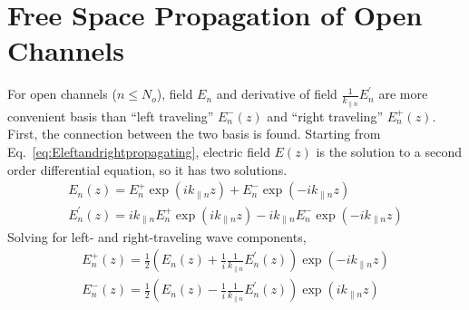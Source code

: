 \section{Free Space Propagation of Open Channels}
For open channels ($n \leq N_o$), field $E_n$ and derivative of field $ \frac{1}{k_{\parallel n}}E_n^{\prime}$ are more convenient basis than ``left traveling'' $E_n^-(z)$ and ``right traveling'' $E_n^+(z)$. First, the connection between the two basis is found. Starting from Eq.~\ref{eq:Eleftandrightpropagating}, electric field $E(z)$ is the solution to a second order differential equation, so it has two solutions.
\begin{equation}
\begin{gathered}
E_n(z) = E_n^+ \exp(i k_{\parallel n} z) + E_n^- \exp(-i k_{\parallel n} z) \\
E_n^{\prime}(z) = i k_{\parallel n} E_n^+ \exp(i k_{\parallel n} z) - i k_{\parallel n}E_n^- \exp(-i k_{\parallel n} z)
\label{eq:Eleftandrightpropagating_again}
\end{gathered}
\end{equation}
Solving for left- and right-traveling wave components,
\begin{equation}
\begin{gathered}
E_n^+(z) = \frac{1}{2} \left( E_n(z)+\frac{1}{i} \frac{1}{k_{\parallel n}} E_n^{\prime}(z) \right) \exp(-i k_{\parallel n} z) \\ 
E_n^-(z) = \frac{1}{2} \left( E_n(z)-\frac{1}{i} \frac{1}{k_{\parallel n}} E_n^{\prime}(z) \right) \exp(i k_{\parallel n} z) 
\label{eq:Eleftright}
\end{gathered}
\end{equation}

